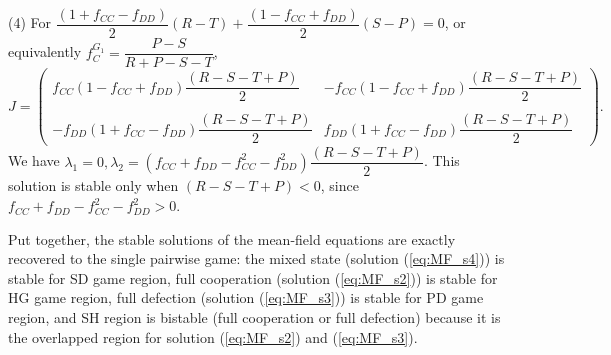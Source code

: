 \documentclass[showpacs,superscriptaddress,reprint,nofootinbib,amsmath,amssymb,aps,pre]{revtex4-1}
\begin{document}
\begin{widetext}
(4) For $\dfrac{(1+f_{CC}-f_{DD})}{2}(R-T)+\dfrac{(1-f_{CC}+f_{DD})}{2}(S-P)=0$,  or equivalently $f^{G_1}_C=\dfrac{P-S}{R+P-S-T}$,
\small
\begin{equation}
J=\begin{pmatrix}
f_{CC}(1-f_{CC}+f_{DD})\dfrac{(R-S-T+P)}{2} & -f_{CC}(1-f_{CC}+f_{DD})\dfrac{(R-S-T+P)}{2} \\
\\-f_{DD}(1+f_{CC}-f_{DD})\dfrac{(R-S-T+P)}{2}& f_{DD}(1+f_{CC}-f_{DD})\dfrac{(R-S-T+P)}{2}
\end{pmatrix}.
\end{equation}
\normalsize
We have $\lambda_{1}=0,\lambda_{2}=(f_{CC}+f_{DD}-f^{2}_{CC}-f^2_{DD})\dfrac{(R-S-T+P)}{2}$. This solution is stable only when $(R-S-T+P)<0$, since $f_{CC}+f_{DD}-f^{2}_{CC}-f^2_{DD}>0$.

Put together, the stable solutions of the mean-field equations are exactly recovered to the single pairwise game: the mixed state (solution (\ref{eq:MF_s4})) is stable for SD game region, full cooperation (solution (\ref{eq:MF_s2})) is stable for HG game region, full defection (solution (\ref{eq:MF_s3})) is stable for PD game region, and SH region is bistable (full cooperation or full defection) because it is the overlapped region for solution (\ref{eq:MF_s2}) and (\ref{eq:MF_s3}).
\end{widetext}

\end{document}
